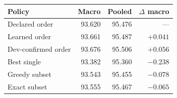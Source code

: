 \begin{tabular*}{\columnwidth}{@{\extracolsep{\fill}}lrrr@{}}
\toprule Policy & Macro & Pooled & $\Delta$ macro \\\midrule
Declared order & 93.620 & 95.476 & --- \\
Learned order & 93.661 & 95.487 & $+0.041$ \\
Dev-confirmed order & 93.676 & 95.506 & $+0.056$ \\
Best single & 93.382 & 95.360 & $-0.238$ \\
Greedy subset & 93.543 & 95.455 & $-0.078$ \\
Exact subset & 93.555 & 95.467 & $-0.065$ \\
\bottomrule\end{tabular*}
